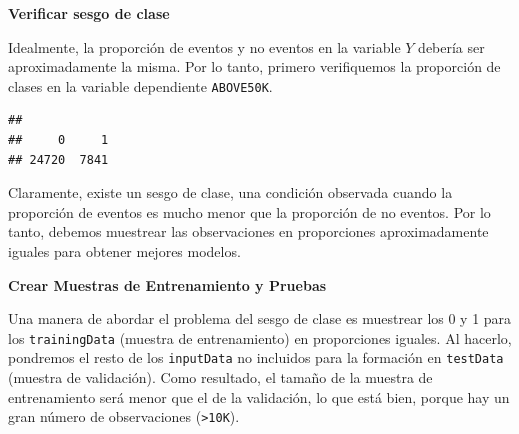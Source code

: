 \documentclass[]{book}
\newenvironment{Shaded}{\begin{snugshade}}{\end{snugshade}}
\newcommand{\KeywordTok}[1]{\textcolor[rgb]{0.13,0.29,0.53}{\textbf{#1}}}
\newcommand{\OperatorTok}[1]{\textcolor[rgb]{0.81,0.36,0.00}{\textbf{#1}}}
\newcommand{\NormalTok}[1]{#1}
\begin{document}
\textbf{Verificar sesgo de clase}

Idealmente, la proporción de eventos y no eventos en la variable \(Y\)
debería ser aproximadamente la misma. Por lo tanto, primero verifiquemos
la proporción de clases en la variable dependiente \texttt{ABOVE50K}.

\begin{Shaded}
\end{Shaded}

\begin{verbatim}
## 
##     0     1 
## 24720  7841
\end{verbatim}

Claramente, existe un sesgo de clase, una condición observada cuando la
proporción de eventos es mucho menor que la proporción de no eventos.
Por lo tanto, debemos muestrear las observaciones en proporciones
aproximadamente iguales para obtener mejores modelos.

\textbf{Crear Muestras de Entrenamiento y Pruebas}

Una manera de abordar el problema del sesgo de clase es muestrear los 0
y 1 para los \texttt{trainingData} (muestra de entrenamiento) en
proporciones iguales. Al hacerlo, pondremos el resto de los
\texttt{inputData} no incluidos para la formación en \texttt{testData}
(muestra de validación). Como resultado, el tamaño de la muestra de
entrenamiento será menor que el de la validación, lo que está bien,
porque hay un gran número de observaciones (\texttt{\textgreater{}10K}).
\end{document}
